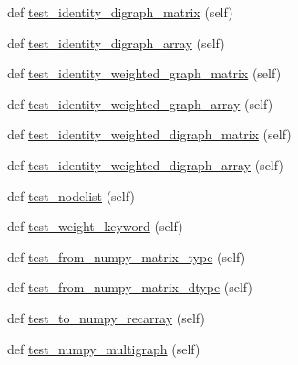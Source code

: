 \begin{DoxyCompactItemize}
\item 
def \hyperlink{classnetworkx_1_1tests_1_1test__convert__numpy_1_1TestConvertNumpyMatrix_a295eb38cfbb1089409c1c6edd3dfa29e}{test\+\_\+identity\+\_\+digraph\+\_\+matrix} (self)
\item 
def \hyperlink{classnetworkx_1_1tests_1_1test__convert__numpy_1_1TestConvertNumpyMatrix_a3ef6c46ec8d8ab0cc0a3c9c852a800a6}{test\+\_\+identity\+\_\+digraph\+\_\+array} (self)
\item 
def \hyperlink{classnetworkx_1_1tests_1_1test__convert__numpy_1_1TestConvertNumpyMatrix_a8c4a0575d31eff73e6fb3df0dfc21eff}{test\+\_\+identity\+\_\+weighted\+\_\+graph\+\_\+matrix} (self)
\item 
def \hyperlink{classnetworkx_1_1tests_1_1test__convert__numpy_1_1TestConvertNumpyMatrix_a91691db6ec650470279ceb9c3bf9bb9a}{test\+\_\+identity\+\_\+weighted\+\_\+graph\+\_\+array} (self)
\item 
def \hyperlink{classnetworkx_1_1tests_1_1test__convert__numpy_1_1TestConvertNumpyMatrix_a751c2f66cd09f946c5d41e2d0ebe7000}{test\+\_\+identity\+\_\+weighted\+\_\+digraph\+\_\+matrix} (self)
\item 
def \hyperlink{classnetworkx_1_1tests_1_1test__convert__numpy_1_1TestConvertNumpyMatrix_a82e2942ff03a4618971bcc6f7f70b0bd}{test\+\_\+identity\+\_\+weighted\+\_\+digraph\+\_\+array} (self)
\item 
def \hyperlink{classnetworkx_1_1tests_1_1test__convert__numpy_1_1TestConvertNumpyMatrix_a5db1501b56f671b36b95e1a9dd48be6c}{test\+\_\+nodelist} (self)
\item 
def \hyperlink{classnetworkx_1_1tests_1_1test__convert__numpy_1_1TestConvertNumpyMatrix_a986a08d9f86bc95ba7e8acbe61de293c}{test\+\_\+weight\+\_\+keyword} (self)
\item 
def \hyperlink{classnetworkx_1_1tests_1_1test__convert__numpy_1_1TestConvertNumpyMatrix_a16e63321e7bc94148d83c56832091266}{test\+\_\+from\+\_\+numpy\+\_\+matrix\+\_\+type} (self)
\item 
def \hyperlink{classnetworkx_1_1tests_1_1test__convert__numpy_1_1TestConvertNumpyMatrix_adac7cc475852a57eb36046472f569437}{test\+\_\+from\+\_\+numpy\+\_\+matrix\+\_\+dtype} (self)
\item 
def \hyperlink{classnetworkx_1_1tests_1_1test__convert__numpy_1_1TestConvertNumpyMatrix_a6f730359a3ab9d2d0ecbc44e2a871b30}{test\+\_\+to\+\_\+numpy\+\_\+recarray} (self)
\item 
def \hyperlink{classnetworkx_1_1tests_1_1test__convert__numpy_1_1TestConvertNumpyMatrix_a32e2f90c1e7df3d5281832e71255223c}{test\+\_\+numpy\+\_\+multigraph} (self)

\end{DoxyCompactItemize}

